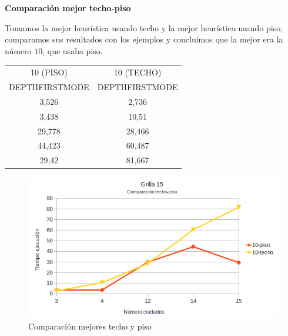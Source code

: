 \documentclass[10pt]{article}
\begin{document}
\newpage
\textbf{Comparación mejor techo-piso}

Tomamos la mejor heurística usando techo y la mejor heurística usando piso, comparamos sus resultados con los ejemplos y concluimos que la mejor era la número $10$, que usaba piso.\\


 
\begin{table}[ht]
\begin{minipage}[b]{1\linewidth}
 \centering
    \begin{tabular}{|c|c|}
        \hline
        10 (PISO)                        & 10 (TECHO)        \\ 
        DEPTHFIRSTMODE                   & DEPTHFIRSTMODE    \\ \hline
        3,526                            & 2,736              \\ \hline
        3,438                            & 10,51             \\ \hline
        29,778                           & 28,466            \\ \hline
        44,423                           & 60,487             \\ \hline
        29,42                            & 81,667             \\
        \hline
    \end{tabular}
    \end{minipage}
\end{table}


\begin{figure}[ht]
\begin{minipage}[b]{1\linewidth}
 \centering
 \includegraphics[scale=0.4]{grilla15ceilfloor.png}
 \caption{Comparación mejores techo y piso}
 \label{fig:grid15ceilfloor}
 \end{minipage}
\end{figure}
\end{document}

